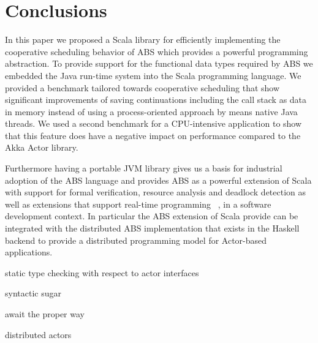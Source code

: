 \section{Conclusions}
\label{conc}
In this paper we proposed a Scala library for efficiently implementing the cooperative scheduling behavior of ABS which provides a powerful programming abstraction. 
To provide support for the functional data types required by ABS we embedded the Java run-time system into the Scala programming language. 
We provided a benchmark tailored towards cooperative scheduling that show significant improvements of saving continuations including the call stack as data in memory instead of using a process-oriented approach by means native Java threads. 
We used a second benchmark for a CPU-intensive application to show that this feature does have a negative impact on performance compared to the Akka Actor library.

\par Furthermore having a portable JVM library gives us a basis for industrial adoption of the ABS language and provides ABS as a powerful extension of Scala with support for formal verification, resource analysis and deadlock detection as well as extensions that support real-time programming ~\cite{rabs}, in a software development context. In particular the ABS extension of Scala provide can be integrated with the distributed ABS implementation that exists in the Haskell backend \cite{cloud} to provide a distributed programming model for Actor-based applications.

static type checking with respect to actor interfaces

syntactic sugar 

await the proper way

distributed actors




